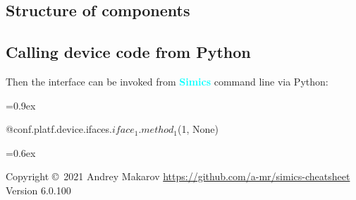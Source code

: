 \documentclass[8pt]{extarticle}
\newenvironment{code}[1][]{%
\begin{prebox}[#1]\obeylines%
\fontdimen2\font=0.9ex%
}{%
\end{prebox}%
\fontdimen2\font=0.6ex%
}
\newcommand{\Simics}{\textcolor{cyan}{\textbf{Simics}}}
\begin{document}
\begin{multicols*}{3}
\subsection{Structure of components}

\subsection{Calling device code from Python}

Then the interface can be invoked from \Simics{} command line via Python:
\begin{code}
    @conf.platf.device.ifaces.$iface_1$.$method_1$(1, None)
\end{code}

Copyright \copyright\ 2021 Andrey Makarov
\href{https://github.com/a-mr/simics-cheatsheet}{https://github.com/a-mr/simics-cheatsheet}
Version 6.0.100

\end{multicols*}
\end{document}
